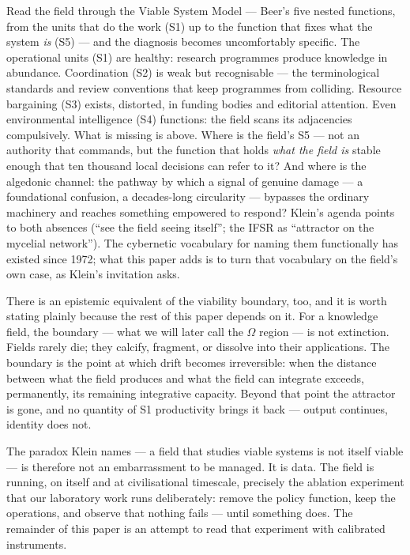 \documentclass[12pt]{article}
\begin{document}
Read the field through the Viable System Model --- Beer's five nested functions,
from the units that do the work (S1) up to the function that fixes what the
system \emph{is} (S5) --- and the diagnosis becomes uncomfortably specific. The
operational units (S1) are healthy: research programmes produce knowledge in
abundance. Coordination (S2) is weak but
recognisable --- the terminological standards and review conventions that keep
programmes from colliding. Resource bargaining (S3) exists, distorted, in
funding bodies and editorial attention. Even environmental intelligence (S4)
functions: the field scans its adjacencies compulsively. What is missing is
above. Where is the field's S5 --- not an authority that commands, but the
function that holds \emph{what the field is} stable enough that ten thousand
local decisions can refer to it? And where is the algedonic channel: the
pathway by which a signal of genuine damage --- a foundational confusion, a
decades-long circularity --- bypasses the ordinary machinery and reaches
something empowered to respond? Klein's agenda points to both absences
(``see the field seeing itself''; the IFSR as ``attractor on the mycelial
network''). The cybernetic vocabulary for naming them functionally has existed
since 1972; what this paper adds is to turn that vocabulary on the field's own
case, as Klein's invitation asks.

There is an epistemic equivalent of the viability boundary, too, and it is
worth stating plainly because the rest of this paper depends on it. For a
knowledge field, the boundary --- what we will later call the $\Omega$ region
--- is not extinction. Fields rarely die; they calcify, fragment, or dissolve
into their applications. The boundary is the point at which drift becomes
irreversible: when the distance between what the field produces and what the
field can integrate exceeds, permanently, its remaining integrative capacity.
Beyond that point the attractor is gone, and no quantity of S1 productivity
brings it back --- output continues, identity does not.

The paradox Klein names --- a field that studies viable systems is not itself
viable --- is therefore not an embarrassment to be managed. It is data. The
field is running, on itself and at civilisational timescale, precisely the
ablation experiment that our laboratory work runs deliberately: remove the
policy function, keep the operations, and observe that nothing fails --- until
something does. The remainder of this paper is an attempt to read that
experiment with calibrated instruments.
\end{document}
